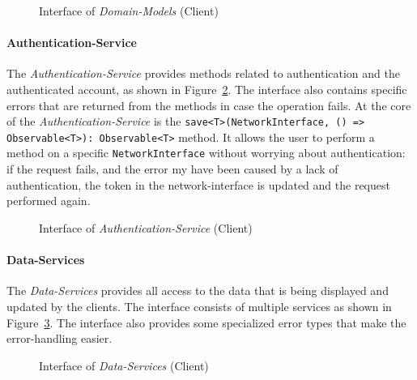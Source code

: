 \begin{figure}
    \centering

    \caption{Interface of \textit{Domain-Models} (Client)}
    \label{fig:common-domain-models}
\end{figure}

\paragraph{Authentication-Service}\label{par:common-authentication-service}
The \textit{Authentication-Service} provides methods related to authentication and the authenticated account, as shown in Figure~\ref{fig:common-authentication-service}. \newline
The interface also contains specific errors that are returned from the methods in case the operation fails. \newline
At the core of the \textit{Authentication-Service} is the \texttt{save<T>(NetworkInterface, () => Observable<T>): Observable<T>} method.
It allows the user to perform a method on a specific \texttt{NetworkInterface} without worrying about authentication: if the request fails, and the error my have been caused by a lack of authentication, the token in the network-interface is updated and the request performed again.

\begin{figure}
    \centering

    \caption{Interface of \textit{Authentication-Service} (Client)}
    \label{fig:common-authentication-service}
\end{figure}

\paragraph{Data-Services}\label{par:common-data-services}
The \textit{Data-Services} provides all access to the data that is being displayed and updated by the clients.
The interface consists of multiple services as shown in Figure~\ref{fig:common-data-services}. \newline
The interface also provides some specialized error types that make the error-handling easier.

\begin{figure}
    \centering

    \caption{Interface of \textit{Data-Services} (Client)}
    \label{fig:common-data-services}
\end{figure}

